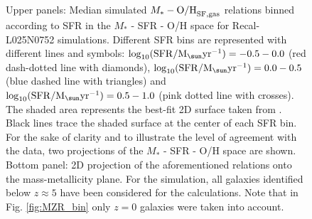 \documentclass[useAMS,usenatbib]{mn2e}
\begin{document}
\begin{figure}
\begin{center}
\vspace{-1cm}\\
\vspace{-1cm}\\
\vspace{-0.3cm}
\vspace{-0.25cm}
\end{center}
\caption[]
{
Upper panels: Median simulated $M_* - {\rm O/H}_{\rm SF,gas}$ relations binned according 
to SFR in the $M_*$ - SFR - O/H space for Recal-L025N0752 simulations.
Different SFR bins are represented with different lines and symbols: 
$\log_{10} ({\rm SFR} / {\rm M}_{\sun} {\rm yr}^{-1})= -0.5-0.0$ 
(red dash-dotted line with diamonds), 
$\log_{10} ({\rm SFR} / {\rm M}_{\sun} {\rm yr}^{-1}) = 0.0-0.5$ (blue dashed line with triangles) and
$\log_{10} ({\rm SFR} / {\rm M}_{\sun} {\rm yr}^{-1}) = 0.5-1.0$ (pink dotted line with crosses). 
The shaded area represents the best-fit 2D surface taken from \citet{mannucci2010}.
Black lines trace the shaded surface at the center of each SFR bin. 
For the sake of clarity and to illustrate the level of agreement with the data, two projections
of the $M_*$ - SFR - O/H space are shown.
Bottom panel: 2D projection of the aforementioned relations onto the mass-metallicity plane.
For the simulation, all galaxies identified below $z\approx5$ have been considered for the calculations.
Note that in Fig. \ref{fig:MZR_bin} only $z=0$ galaxies were taken into account.
}
\label{fig:FMR}
\end{figure}
\end{document}
